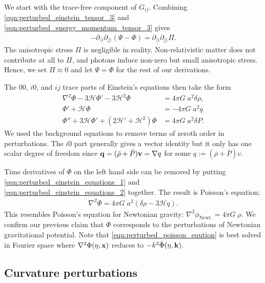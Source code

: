 We start with the trace-free component of $G_{ij}$. Combining  \eqref{eqn:perturbed_einstein_tensor_3} and \eqref{eqn:perturbed_energy_momentum_tensor_3} gives
\begin{align}
	-\partial_{\langle i} \partial_{j \rangle} (\Psi - \Phi) = \partial_{\langle i} \partial_{j \rangle} \Pi.
\end{align}
The anisotropic stress $\Pi$ is negligible in reality. Non-relativistic matter does not contribute at all to $\Pi$, and photons induce non-zero but small anisotropic stress. Hence, we set $\Pi\approx 0$ and let $\Psi = \Phi$ for the rest of our derivations.

The $00$, $i0$, and $ij$ trace parts of Einstein's equations then take the form
\begin{align}
	\nabla^2 \Phi - 3 \mathcal{H} \Phi' - 3\mathcal{H}^2 \Phi &= 4\pi G \; a^2 \delta\rho, \label{eqn:perturbed_einstein_equations_1}\\
	\Phi' + \mathcal{H} \Phi &= -4\pi G \; a^2 q \label{eqn:perturbed_einstein_equations_2}\\
	\Phi'' + 3\mathcal{H} \Phi' + (2\mathcal{H}' + \mathcal{H}^2) \Phi &= 4\pi G \; a^2 \delta P. \label{eqn:perturbed_einstein_equations_3}
\end{align}
We used the background equations to remove terms of zeroth order in perturbations. The $i0$ part generally gives a vector identity but it only has one scalar degree of freedom since $\mathbf{q}=(\bar{\rho}+\bar{P})\mathbf{v} = \nabla q$ for some $q := (\bar{\rho}+\bar{P}) v$.

Time derivatives of $\Phi$ on the left hand side can be removed by putting \eqref{eqn:perturbed_einstein_equations_1} and \eqref{eqn:perturbed_einstein_equations_2} together. The result is Poisson's equation;
\begin{align}
	\nabla^2 \Phi = 4\pi G \; a^2 (\delta\rho - 3\mathcal{H}q). \label{eqn:perturbed_poisson_eqution}
\end{align}
This resembles Poisson's equation for Newtonian gravity: $\nabla^2 \phi_{\text{Newt.}} = 4\pi G \; \rho$. We confirm our previous claim that $\Phi$ corresponds to the perturbations of Newtonian gravitational potential. Note that \eqref{eqn:perturbed_poisson_eqution} is best solved in Fourier space where $\nabla^2\Phi(\eta,\mathbf{x})$ reduces to $-k^2 \tilde{\Phi}(\eta,\mathbf{k})$.


\subsection{Curvature perturbations} \label{section:curvature_perturbations}

